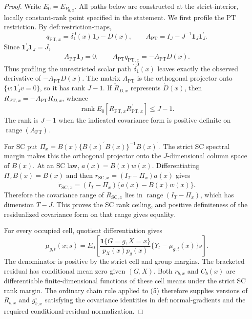 \documentclass{article}
\begin{document}
\begin{proof}
Write \(E_0=E_{P_{0,O}}\).  All paths below are constructed at the strict-interior, locally constant-rank point specified in the statement.  We first profile the PT restriction.  By \(\mathrm{def{:}restriction\text{-}maps}\),
\[
 q_{\mathrm{PT},x}=\delta_1^0(x)\mathbf 1_J-D(x),
 \qquad
 A_{\mathrm{PT}}=I_J-J^{-1}\mathbf 1_J\mathbf 1_J^{\prime}.
 \tag{1}
\]
Since \(\mathbf 1_J^{\prime}\mathbf 1_J=J\),
\[
 A_{\mathrm{PT}}\mathbf 1_J=0,
 \qquad
 A_{\mathrm{PT}}\dot q_{\mathrm{PT},x}=-A_{\mathrm{PT}}\dot D(x).
 \tag{2}
\]
Thus profiling the unrestricted scalar path \(\dot\delta_1^0(x)\) leaves exactly the observed derivative of \(-A_{\mathrm{PT}}D(x)\).  The matrix \(A_{\mathrm{PT}}\) is the orthogonal projector onto \(\{v:\mathbf 1_J^{\prime}v=0\}\), so it has rank \(J-1\).  If \(\widetilde R_{D,x}\) represents \(\dot D(x)\), then \(R_{\mathrm{PT},x}=-A_{\mathrm{PT}}\widetilde R_{D,x}\), whence
\[
 \operatorname{rank}E_0[R_{\mathrm{PT},x}R_{\mathrm{PT},x}^{\prime}]
 \le J-1.
 \tag{3}
\]
The rank is \(J-1\) when the indicated covariance form is positive definite on \(\operatorname{range}(A_{\mathrm{PT}})\).

For SC put \(\Pi_x=B(x)\{B(x)^{\prime}B(x)\}^{-1}B(x)^{\prime}\).  The strict SC spectral margin makes this the orthogonal projector onto the \(J\)-dimensional column space of \(B(x)\).  At an SC law, \(a(x)=B(x)w(x)\).  Differentiating \(\Pi_xB(x)=B(x)\) and then \(r_{\mathrm{SC},x}=(I_T-\Pi_x)a(x)\) gives
\[
 \dot r_{\mathrm{SC},x}
 =(I_T-\Pi_x)\{\dot a(x)-\dot B(x)w(x)\}.
 \tag{4}
\]
Therefore the covariance range of \(R_{\mathrm{SC},x}\) lies in \(\operatorname{range}(I_T-\Pi_x)\), which has dimension \(T-J\).  This proves the SC rank ceiling, and positive definiteness of the residualized covariance form on that range gives equality.

For every occupied cell, quotient differentiation gives
\[
 \dot\mu_{g,t}(x;s)
 =E_0\!\left[
 \frac{\mathbf 1\{G=g,X=x\}}{p_X(x)p_g(x)}
 \{Y_t-\mu_{g,t}(x)\}s\right].
 \tag{5}
\]
The denominator is positive by the strict cell and group margins.  The bracketed residual has conditional mean zero given \((G,X)\).  Both \(r_{b,x}\) and \(C_b(x)\) are differentiable finite-dimensional functions of these cell means under the strict SC rank margin.  The ordinary chain rule applied to (5) therefore supplies versions of \(R_{b,x}\) and \(g^{\circ}_{b,x}\) satisfying the covariance identities in \(\mathrm{def{:}normal\text{-}gradients}\) and the required conditional-residual normalization.


\end{proof}
\end{document}

